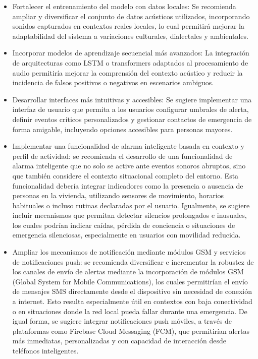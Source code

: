 
\begin{itemize}
  \item Fortalecer el entrenamiento del modelo con datos locales: Se recomienda ampliar y diversificar el conjunto de datos acústicos utilizados, incorporando sonidos capturados en contextos reales locales, lo cual permitirá mejorar la adaptabilidad del sistema a variaciones culturales, dialectales y ambientales.
  \item Incorporar modelos de aprendizaje secuencial más avanzados: La integración de arquitecturas como LSTM o transformers adaptados al procesamiento de audio permitiría mejorar la comprensión del contexto acústico y reducir la incidencia de falsos positivos o negativos en escenarios ambiguos.
  \item Desarrollar interfaces más intuitivas y accesibles: Se sugiere implementar una interfaz de usuario que permita a los usuarios configurar umbrales de alerta, definir eventos críticos personalizados y gestionar contactos de emergencia de forma amigable, incluyendo opciones accesibles para personas mayores.
  \item Implementar una funcionalidad de alarma inteligente basada en contexto y perfil de actividad: se recomienda el desarrollo de una funcionalidad de alarma inteligente que no solo se active ante eventos sonoros abruptos, sino que también considere el contexto situacional completo del entorno. Esta funcionalidad debería integrar indicadores como la presencia o ausencia de personas en la vivienda, utilizando sensores de movimiento, horarios habituales o incluso rutinas declaradas por el usuario. Igualmente, se sugiere incluir mecanismos que permitan detectar silencios prolongados e inusuales, los cuales podrían indicar caídas, pérdida de conciencia o situaciones de emergencia silenciosas, especialmente en usuarios con movilidad reducida.
  \item Ampliar los mecanismos de notificación mediante módulos GSM y servicios de notificaciones push: se recomienda diversificar e incrementar la robustez de los canales de envío de alertas mediante la incorporación de módulos GSM (Global System for Mobile Communications), los cuales permitirían el envío de mensajes SMS directamente desde el dispositivo sin necesidad de conexión a internet. Esto resulta especialmente útil en contextos con baja conectividad o en situaciones donde la red local pueda fallar durante una emergencia. De igual forma, se sugiere integrar notificaciones push móviles, a través de plataformas como Firebase Cloud Messaging (FCM), que permitirían alertas más inmediatas, personalizadas y con capacidad de interacción desde teléfonos inteligentes.
\end{itemize}